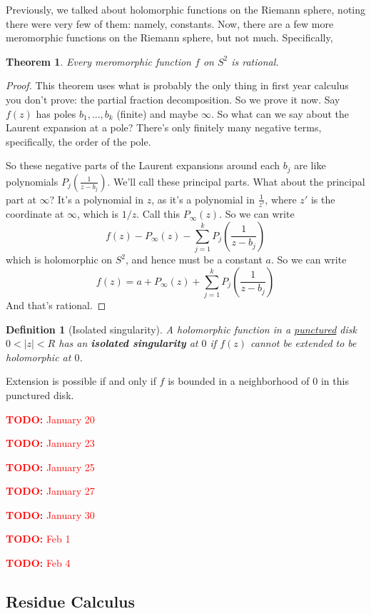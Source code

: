 \documentclass{article}
\newtheorem{theorem}{Theorem}
\newtheorem{definition}{Definition}
\newcommand{\TODO}[1]{\begin{center}\huge{\textcolor{red}{\textbf{TODO:} #1}}\end{center}}
\begin{document}
Previously, we talked about holomorphic functions on the Riemann sphere, noting there were very few of them: namely, constants. Now, there are a few more meromorphic functions on the Riemann sphere, but not much. Specifically,
\begin{theorem}
Every meromorphic function \(f\) on \(S^2\) is rational.
\end{theorem}
\begin{proof}
This theorem uses what is probably the only thing in first year calculus you don't prove: the partial fraction decomposition. So we prove it now.
Say \(f(z)\) has poles \(b_1,...,b_k\) (finite) and maybe \(\infty\). So what can we say about the Laurent expansion at a pole? There's only finitely many negative terms, specifically, the order of the pole.

So these negative parts of the Laurent expansions around each \(b_j\) are like polynomials \(P_j(\frac{1}{z - b_j})\). We'll call these principal parts. What about the principal part at \(\infty\)? It's a polynomial in \(z\), as it's a polynomial in \(\frac{1}{z'}\), where \(z'\) is the coordinate at \(\infty\), which is \(1/z\). Call this \(P_\infty(z)\). So we can write
\[f(z) - P_\infty(z) - \sum_{j = 1}^kP_j\left(\frac{1}{z - b_j}\right)\]
which is holomorphic on \(S^2\), and hence must be a constant \(a\). So we can write
\[f(z) = a + P_\infty(z) + \sum_{j = 1}^kP_j\left(\frac{1}{z - b_j}\right)\]
And that's rational.
\end{proof}
\begin{definition}[Isolated singularity]
A holomorphic function in a \underline{punctured} disk \(0 < |z| < R\) has an \textbf{isolated singularity} at \(0\) if \(f(z)\) cannot be extended to be holomorphic at \(0\).
\end{definition}
Extension is possible if and only if \(f\) is bounded in a neighborhood of \(0\) in this punctured disk.

\TODO{January 20}

\TODO{January 23}

\TODO{January 25}

\TODO{January 27}

\TODO{January 30}

\TODO{Feb 1}

\TODO{Feb 4}

\subsection{Residue Calculus}
\end{document}
